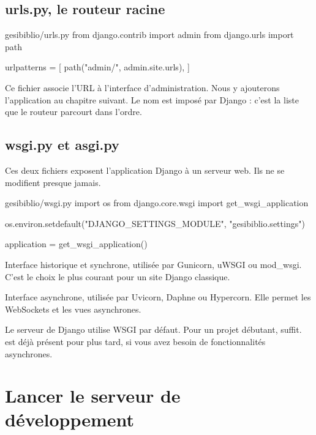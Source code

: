 \subsection{urls.py, le routeur racine}

\begin{codebox}[python]{gesibiblio/urls.py}
from django.contrib import admin
from django.urls import path

urlpatterns = [
    path("admin/", admin.site.urls),
]
\end{codebox}

Ce fichier associe l'URL  à l'interface d'administration. Nous y
ajouterons l'application  au chapitre suivant. Le nom
 est imposé par Django : c'est la liste que le routeur parcourt
dans l'ordre.

\subsection{wsgi.py et asgi.py}

Ces deux fichiers exposent l'application Django à un serveur web. Ils ne se
modifient presque jamais.

\begin{codebox}[python]{gesibiblio/wsgi.py}
import os
from django.core.wsgi import get_wsgi_application

os.environ.setdefault("DJANGO_SETTINGS_MODULE", "gesibiblio.settings")

application = get_wsgi_application()
\end{codebox}

\begin{description}[leftmargin=2.4cm,style=nextline]
  \item[WSGI] Interface historique et synchrone, utilisée par Gunicorn, uWSGI ou
  mod\_wsgi. C'est le choix le plus courant pour un site Django classique.
  \item[ASGI] Interface asynchrone, utilisée par Uvicorn, Daphne ou Hypercorn.
  Elle permet les WebSockets et les vues asynchrones.
\end{description}

\begin{note}
Le serveur  de Django utilise WSGI par défaut. Pour un projet
débutant,  suffit.  est déjà présent pour plus tard, si
vous avez besoin de fonctionnalités asynchrones.
\end{note}

\section{Lancer le serveur de développement}

